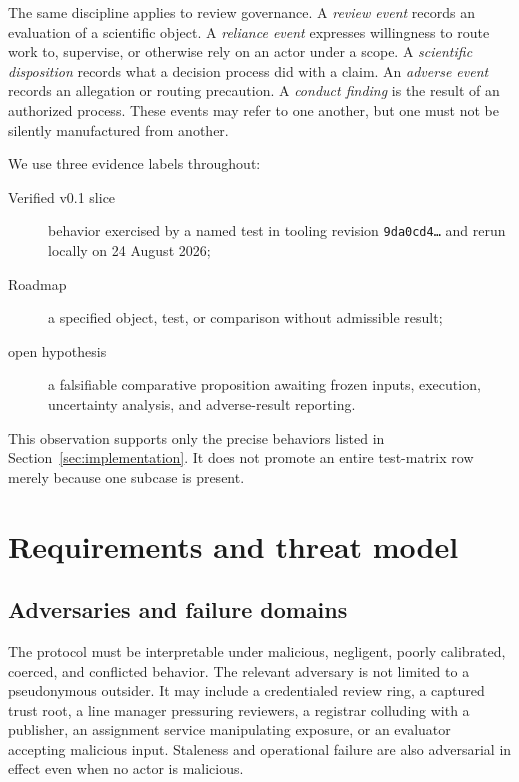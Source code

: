 \documentclass[11pt]{article}
\newcommand{\roadmap}{\textsf{Roadmap}}
\newcommand{\verifiedslice}{\textsf{Verified v0.1 slice}}
\begin{document}
The same discipline applies to review governance. A \emph{review event} records
an evaluation of a scientific object. A \emph{reliance event} expresses willingness
to route work to, supervise, or otherwise rely on an actor under a scope. A
\emph{scientific disposition} records what a decision process did with a claim. An
\emph{adverse event} records an allegation or routing precaution. A
\emph{conduct finding} is the result of an authorized process. These events may
refer to one another, but one must not be silently manufactured from another.

We use three evidence labels throughout:

\begin{description}
  \item[\verifiedslice] behavior exercised by a named test in tooling revision
  \texttt{9da0cd4\ldots} and rerun locally on 24 August 2026;
  \item[\roadmap] a specified object, test, or comparison without admissible result;
  \item[open hypothesis] a falsifiable comparative proposition awaiting frozen
  inputs, execution, uncertainty analysis, and adverse-result reporting.
\end{description}


This observation supports only the precise behaviors listed in
Section~\ref{sec:implementation}. It does not promote an entire test-matrix row
merely because one subcase is present.

\section{Requirements and threat model}
\label{sec:threat}

\subsection{Adversaries and failure domains}

The protocol must be interpretable under malicious, negligent, poorly calibrated,
coerced, and conflicted behavior. The relevant adversary is not limited to a
pseudonymous outsider. It may include a credentialed review ring, a captured trust
root, a line manager pressuring reviewers, a registrar colluding with a publisher,
an assignment service manipulating exposure, or an evaluator accepting malicious
input. Staleness and operational failure are also adversarial in effect even when
no actor is malicious.
\end{document}

